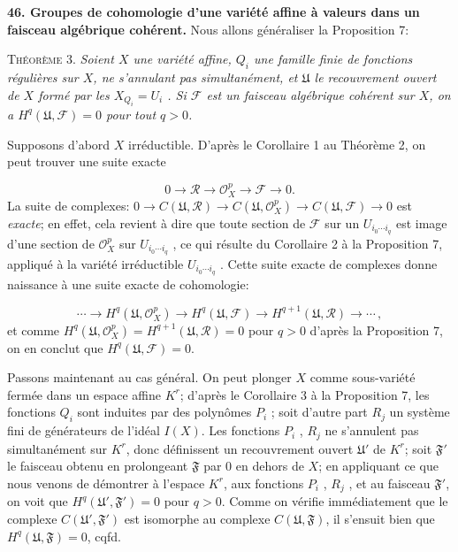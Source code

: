 \textbf{46. Groupes de cohomologie d'une variété affine à valeurs dans un faisceau algébrique cohérent.} Nous allons généraliser la Proposition 7:

\textsc{Théorème} 3. \textit{Soient $X$ une variété affine, $Q_i$ une famille finie de fonctions régulières sur $X$, ne s'annulant pas simultanément, et $\mathfrak{U}$ le recouvrement ouvert de $X$ formé par les $X_{Q_i} = U_i$ . Si $\mathcal{F}$ est un faisceau algébrique cohérent sur $X$, on a $H^q(\mathfrak{U}, \mathcal{F}) = 0$ pour tout $q > 0$.}

Supposons d'abord $X$ irréductible. D'après le Corollaire 1 au Théorème 2, on peut trouver une suite exacte

\begin{equation*}
0 \to \mathcal{R} \to \mathcal{O}_X^p \to \mathcal{F} \to 0.
\end{equation*}
La suite de complexes: $0 \to C(\mathfrak{U}, \mathcal{R}) \to C(\mathfrak{U}, \mathcal{O}_X^p) \to C(\mathfrak{U}, \mathcal{F}) \to 0$ est \textit{exacte}; en effet, cela revient à dire que toute section de $\mathcal{F}$ sur un $U_{i_0\cdots i_q}$ est image d'une section de $\mathcal{O}_X^p$ sur $U_{i_0\cdots i_q}$ , ce qui résulte du Corollaire 2 à la Proposition 7, appliqué à la variété irréductible $U_{i_0\cdots i_q}$ . Cette suite exacte de complexes donne naissance à une suite exacte de cohomologie:

\begin{equation*}
\cdots \to H^q(\mathfrak{U}, \mathcal{O}_X^p) \to H^q(\mathfrak{U}, \mathcal{F}) \to H^{q+1}(\mathfrak{U}, \mathcal{R}) \to \cdots \, ,
\end{equation*}
et comme $H^q(\mathfrak{U}, \mathcal{O}_X^p) = H^{q+1}(\mathfrak{U}, \mathcal{R}) = 0$ pour $q > 0$ d'après la Proposition 7, on en conclut que $H^q(\mathfrak{U}, \mathcal{F}) = 0$.



Passons maintenant au cas général. On peut plonger $X$ comme sous-variété fermée dans un espace affine $K^r$; d'après le Corollaire 3 à la Proposition 7, les fonctions $Q_i$ sont induites par des polynômes $P_i$ ; soit d'autre part $R_j$ un système fini de générateurs de l'idéal $I(X)$. Les fonctions $P_i$ , $R_j$ ne s'annulent pas simultanément sur $K^r$, donc définissent un recouvrement ouvert $\mathfrak{U}'$ de $K^r$; soit $\mathfrak{F}'$ le faisceau obtenu en prolongeant $\mathfrak{F}$ par 0 en dehors de $X$; en appliquant ce que nous venons de démontrer à l'espace $K^r$, aux fonctions $P_i$ , $R_j$ , et au faisceau $\mathfrak{F}'$, on voit que $H^q(\mathfrak{U}', \mathfrak{F}') = 0$ pour $q > 0$. Comme on vérifie immédiatement que le complexe $C(\mathfrak{U}', \mathfrak{F}')$ est isomorphe au complexe $C(\mathfrak{U}, \mathfrak{F})$, il s'ensuit bien que $H^q(\mathfrak{U}, \mathfrak{F}) = 0$, cqfd.

